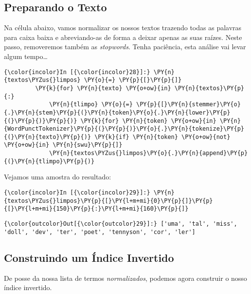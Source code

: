     \subsection{Preparando o Texto}\label{preparando-o-texto}

Na célula abaixo, vamos normalizar os nossos textos trazendo todas as
palavras para caixa baixa e abreviando-as de forma a deixar apenas as
suas raízes. Neste passo, removeremos também as \emph{stopwords}. Tenha
paciência, esta análise vai levar algum tempo\ldots{}

    \begin{Verbatim}[commandchars=\\\{\}]
{\color{incolor}In [{\color{incolor}28}]:} \PY{n}{textos\PYZus{}limpos} \PY{o}{=} \PY{p}{[}\PY{p}{]}
         \PY{k}{for} \PY{n}{texto} \PY{o+ow}{in} \PY{n}{textos}\PY{p}{:}
             \PY{n}{tlimpo} \PY{o}{=} \PY{p}{[}\PY{n}{stemmer}\PY{o}{.}\PY{n}{stem}\PY{p}{(}\PY{n}{token}\PY{o}{.}\PY{n}{lower}\PY{p}{(}\PY{p}{)}\PY{p}{)} \PY{k}{for} \PY{n}{token} \PY{o+ow}{in} \PY{n}{WordPunctTokenizer}\PY{p}{(}\PY{p}{)}\PY{o}{.}\PY{n}{tokenize}\PY{p}{(}\PY{n}{texto}\PY{p}{)} \PY{k}{if} \PY{n}{token} \PY{o+ow}{not} \PY{o+ow}{in} \PY{n}{swu}\PY{p}{]}
             \PY{n}{textos\PYZus{}limpos}\PY{o}{.}\PY{n}{append}\PY{p}{(}\PY{n}{tlimpo}\PY{p}{)}
\end{Verbatim}

    Vejamos uma amostra do resultado:

    \begin{Verbatim}[commandchars=\\\{\}]
{\color{incolor}In [{\color{incolor}29}]:} \PY{n}{textos\PYZus{}limpos}\PY{p}{[}\PY{l+m+mi}{0}\PY{p}{]}\PY{p}{[}\PY{l+m+mi}{150}\PY{p}{:}\PY{l+m+mi}{160}\PY{p}{]}
\end{Verbatim}

            \begin{Verbatim}[commandchars=\\\{\}]
{\color{outcolor}Out[{\color{outcolor}29}]:} ['uma', 'tal', 'miss', 'doll', 'dev', 'ter', 'poet', 'tennyson', 'cor', 'ler']
\end{Verbatim}
        
    \subsection{Construindo um Índice
Invertido}\label{construindo-um-uxedndice-invertido}

De posse da nossa lista de termos \emph{normalizados}, podemos agora
construir o nosso índice invertido.

